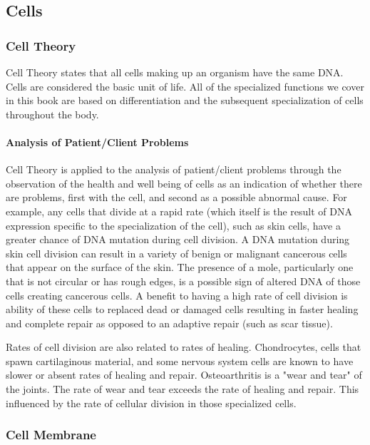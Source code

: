 \subsection{Cells}

\subsubsection{Cell Theory}

Cell Theory states that all cells making up an organism have the same DNA. Cells are considered the basic unit of life. All of the specialized functions we cover in this book are based on differentiation and the subsequent specialization of cells throughout the body.   

\paragraph{Analysis of Patient/Client Problems}
Cell Theory is applied to the analysis of patient/client problems through the observation of the health and well being of cells as an indication of whether there are problems, first with the cell, and second as a possible abnormal cause. For example, any cells that divide at a rapid rate (which itself is the result of DNA expression specific to the specialization of the cell), such as skin cells, have a greater chance of DNA mutation during cell division. A DNA mutation during skin cell division can result in a variety of benign or malignant cancerous cells that appear on the surface of the skin. The presence of a mole, particularly one that is not circular or has rough edges, is a possible sign of altered DNA of those cells creating cancerous cells. A benefit to having a high rate of cell division is ability of these cells to replaced dead or damaged cells resulting in faster healing and complete repair as opposed to an adaptive repair (such as scar tissue).

Rates of cell division are also related to rates of healing. Chondrocytes, cells that spawn cartilaginous material, and some nervous system cells are known to have slower or absent rates of healing and repair. Osteoarthritis is a "wear and tear" of the joints. The rate of wear and tear exceeds the rate of healing and repair. This influenced by the rate of cellular division in those specialized cells. 
 
\subsubsection{Cell Membrane}

